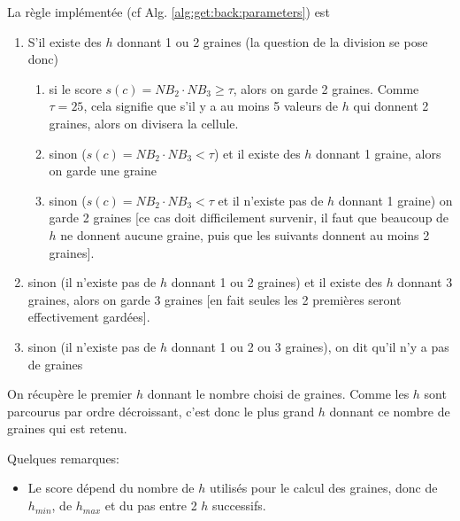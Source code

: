 \documentclass{article}
\begin{document}
\begin{itemize}
\begin{itemize}
La r\`egle impl\'ement\'ee  (cf Alg. \ref{alg:get:back:parameters}) est 
\begin{enumerate}
\itemsep -0.5ex
\item S'il existe des $h$ donnant 1 ou 2 graines (la question de la division se pose donc)
\begin{enumerate}
\itemsep -0.5ex
\item si le score $s(c) = NB_2 \cdot NB_3 \geq \tau$, alors on garde 2 graines. Comme $\tau = 25$, cela signifie que s'il y a au moins 5 valeurs de $h$ qui donnent 2 graines, alors on divisera la cellule.
\item sinon ($s(c) = NB_2 \cdot NB_3 <\tau$) et il existe des $h$ donnant 1 graine, alors on garde une graine
\item sinon ($s(c) = NB_2 \cdot NB_3 <\tau$ et il n'existe pas de $h$ donnant 1 graine) on garde 2 graines [ce cas doit difficilement survenir, il faut que beaucoup de $h$ ne donnent aucune graine, puis que les suivants donnent au moins 2 graines].
\end{enumerate}
\item sinon (il n'existe pas de $h$ donnant 1 ou 2 graines) et il existe des $h$ donnant 3 graines, alors on garde 3 graines [en fait seules les 2 premi\`eres seront effectivement gard\'ees].
\item sinon  (il n'existe pas de $h$ donnant 1 ou 2 ou 3 graines), on dit qu'il n'y a pas de graines
\end{enumerate}
On r\'ecup\`ere le premier $h$ donnant le nombre choisi de graines. Comme les $h$ sont parcourus par ordre d\'ecroissant, c'est donc le plus grand $h$ donnant ce nombre de graines qui est retenu.


Quelques remarques:
\begin{itemize}
\item Le score d\'epend du nombre de $h$ utilis\'es pour le calcul des graines, donc de $h_{min}$, de $h_{max}$ et du pas entre 2 $h$ successifs.
\end{itemize}





\end{itemize}
\end{itemize}
\end{document}
